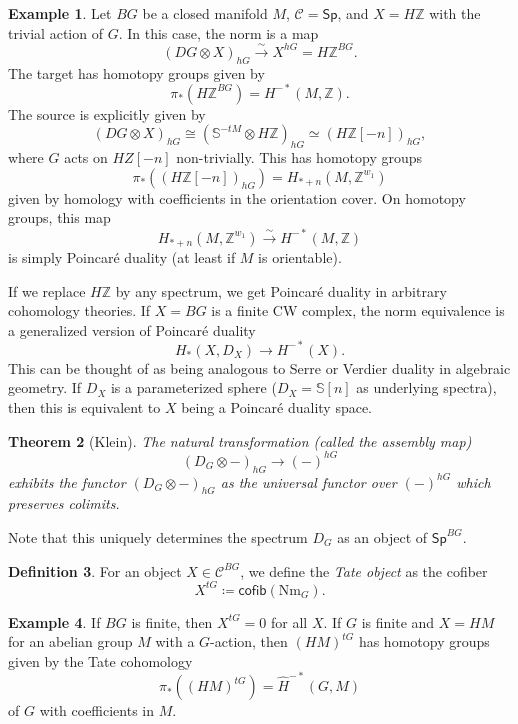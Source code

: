 \documentclass[10pt, oneside]{memoir}
\newtheorem{thm}{Theorem}[subsection]
\theoremstyle{definition}
\newtheorem{defn}[thm]{Definition}
\newtheorem{exm}[thm]{Example}
\theoremstyle{remark}
\theoremstyle{plain}
\theoremstyle{definition}
\theoremstyle{remark}
\newcommand{\Z}{\mathbb{Z}}
\newcommand{\bS}{\mathbb{S}}
\newcommand{\mc}[1]{\mathcal{#1}}
\newcommand{\mr}[1]{\mathrm{#1}}
\newcommand{\ms}[1]{\mathsf{#1}}
\newcommand{\1}{\mathbf{1}}
\newcommand{\2}{\mathbf{2}}
\newcommand{\3}{\mathbf{3}}
\begin{document}
\begin{exm}
    Let \(BG \) be a closed manifold \(M \), \(\mc{C} = \ms{Sp} \), and \(X = H\Z \) with the trivial action of \(G \). In this case, the norm is a map
    \[ (DG \otimes X)_{hG} \xrightarrow{\sim} X^{hG} = H\Z^{BG}. \]
    The target has homotopy groups given by
    \[ \pi_* (H\Z^{BG}) = H^{-*}(M, \Z). \]
    The source is explicitly given by
    \[ (DG \otimes X)_{hG} \cong (\bS^{-tM} \otimes H\Z)_{hG} \simeq (H\Z[-n])_{hG}, \]
    where \(G \) acts on \(HZ[-n] \) non-trivially. This has homotopy groups
    \[ \pi_*((H\Z[-n])_{hG}) = H_{*+n}(M, \Z^{w_1}) \]
    given by homology with coefficients in the orientation cover. On homotopy groups, this map
    \[ H_{*+n}(M, \Z^{w_1}) \xrightarrow{\sim} H^{-*}(M, \Z) \]
    is simply Poincar\'e duality (at least if \(M \) is orientable).
\end{exm}

If we replace \(H\Z \) by any spectrum, we get Poincar\'e duality in arbitrary cohomology theories. If \(X = BG \) is a finite CW complex, the norm equivalence is a generalized version of Poincar\'e duality
\[ H_*(X, D_X) \to H^{-*}(X). \]
This can be thought of as being analogous to Serre or Verdier duality in algebraic geometry. If \(D_X \) is a parameterized sphere (\(D_X = \bS[n] \) as underlying spectra), then this is equivalent to \(X \) being a Poincar\'e duality space.

\begin{thm}[Klein]
    The natural transformation (called the \textit{assembly map})
    \[ (D_G \otimes -)_{hG} \to (-)^{hG} \]
    exhibits the functor \((D_G \otimes -)_{hG} \) as the universal functor over \((-)^{hG} \) which preserves colimits.
\end{thm}

Note that this uniquely determines the spectrum \(D_G \) as an object of \(\ms{Sp}^{BG} \).

\begin{defn}
    For an object \(X \in \mc{C}^{BG} \), we define the \textit{Tate object} as the cofiber
    \[ X^{tG} \coloneqq \ms{cofib}(\mr{Nm}_G). \]
\end{defn}

\begin{exm}
    If \(BG \) is finite, then \(X^{tG} = 0 \) for all \(X \). If \(G \) is finite and \(X = HM \) for an abelian group \(M \) with a \(G \)-action, then \((HM)^{tG} \) has homotopy groups given by the Tate cohomology
    \[ \pi_* ((HM)^{tG}) = \hat{H}^{-*}(G, M) \]
    of \(G \) with coefficients in \(M \).
\end{exm}
\end{document}
